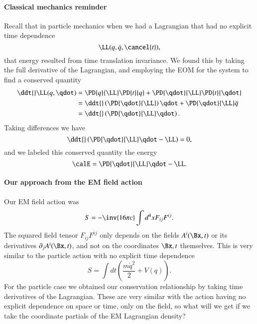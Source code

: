 \paragraph{Classical mechanics reminder}
%
Recall that in particle mechanics when we had a Lagrangian that had no explicit time dependence
%
\begin{equation}\label{eqn:relativisticElectrodynamicsL21b:380}
\LL(q, \dot{q}, \cancel{t}),
\end{equation}
%
that energy resulted from time translation invariance.  We found this by taking the full derivative of the Lagrangian, and employing the EOM for the system to find a conserved quantity
%
\begin{equation}\label{eqn:relativisticElectrodynamicsL21b:560}
\begin{aligned}
\ddt{} \LL(q, \qdot)
&=
\PD{q}{\LL} \PD{t}{q}
+\PD{\qdot}{\LL} \PD{t}{\qdot} \\
&=
\ddt{} \left( \PD{\qdot}{\LL} \right) \qdot
+\PD{\qdot}{\LL} \ddot{q} \\
&=
\ddt{} \left( \PD{\qdot}{\LL} \qdot \right).
\end{aligned}
\end{equation}
%
Taking differences we have
%
\begin{equation}\label{eqn:relativisticElectrodynamicsL21b:400}
\ddt{} \left( \PD{\qdot}{\LL} \qdot -\LL \right) = 0,
\end{equation}
%
and we labeled this conserved quantity the energy
%
\begin{equation}\label{eqn:relativisticElectrodynamicsL21b:420}
\calE = \PD{\qdot}{\LL} \qdot -\LL.
\end{equation}
%
\paragraph{Our approach from the EM field action}
%
Our EM field action was
%
\begin{equation}\label{eqn:relativisticElectrodynamicsL21b:500}
S = -\inv{16 \pi c} \int d^4 x F_{i j} F^{i j}.
\end{equation}
%
The squared field tensor \(F_{i j} F^{i j}\) only depends on the fields \(A^i(\Bx, t)\) or its derivatives \(\partial_j A^i(\Bx, t)\), and not on the coordinates \(\Bx, t\) themselves.  This is very similar to the particle action with no explicit time dependence
%
\begin{equation}\label{eqn:relativisticElectrodynamicsL21b:520}
S = \int dt \left( \frac{m \dot{q}^2}{2} + V(q) \right).
\end{equation}
%
For the particle case we obtained our conservation relationship by taking time derivatives of the Lagrangian.  These are very similar with the action having no explicit dependence on space or time, only on the field, so what will we get if we take the coordinate partials of the EM Lagrangian density?

